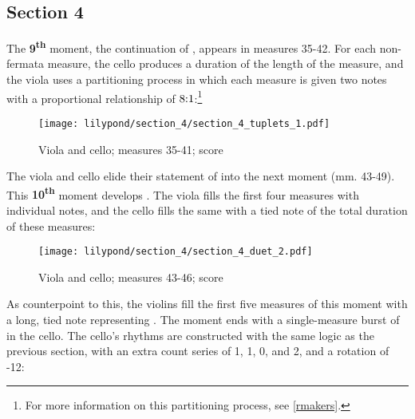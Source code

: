 
\subsection{Section 4}

The \textbf{9\textsuperscript{th}} moment, the continuation of , appears in measures 35-42. For each non-fermata measure, the cello produces a duration of the length of the measure, and the viola uses a partitioning process in which each measure is given two notes with a proportional relationship of \( 8\hspace{-1mm}:\hspace{-1mm}1 \):\footnote{For more information on this partitioning process, see \vref{rmakers}.}

\setcounter{figure}{25}
\begin{figure}[H]
    \texttt{[image: lilypond/section\_4/section\_4\_tuplets\_1.pdf]}
    \caption{Viola and cello; measures 35-41; score}
    \label{fig:section-4-partitioning}
\end{figure}

The viola and cello elide their statement of  into the next moment (mm. 43-49). This \textbf{10\textsuperscript{th}} moment develops . The viola fills the first four measures with individual notes, and the cello fills the same with a tied note of the total duration of these measures:

\setcounter{figure}{26}
\begin{figure}[H]
    \texttt{[image: lilypond/section\_4/section\_4\_duet\_2.pdf]}
    \caption{Viola and cello; measures 43-46; score}
    \label{fig:section-4-notes-v-tie}
\end{figure}

As counterpoint to this, the violins fill the first five measures of this moment with a long, tied note representing . The moment ends with a single-measure burst of  in the cello. The cello's rhythms are constructed with the same logic as the previous section, with an extra count series of 1, 1, 0, and 2, and a rotation of -12:

